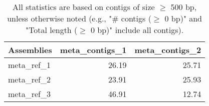\documentclass[12pt,a4paper]{article}
\begin{document}
\begin{table}[ht]
\begin{center}
\caption{All statistics are based on contigs of size $\geq$ 500 bp, unless otherwise noted (e.g., "\# contigs ($\geq$ 0 bp)" and "Total length ($\geq$ 0 bp)" include all contigs).}
\begin{tabular}{|l*{2}{|r}|}
\hline
Assemblies & meta\_contigs\_1 & meta\_contigs\_2 \\ \hline
meta\_ref\_1 & 26.19 & 25.71 \\ \hline
meta\_ref\_2 & 23.91 & 25.93 \\ \hline
meta\_ref\_3 & 46.91 & 12.74 \\ \hline
\end{tabular}
\end{center}
\end{table}
\end{document}
